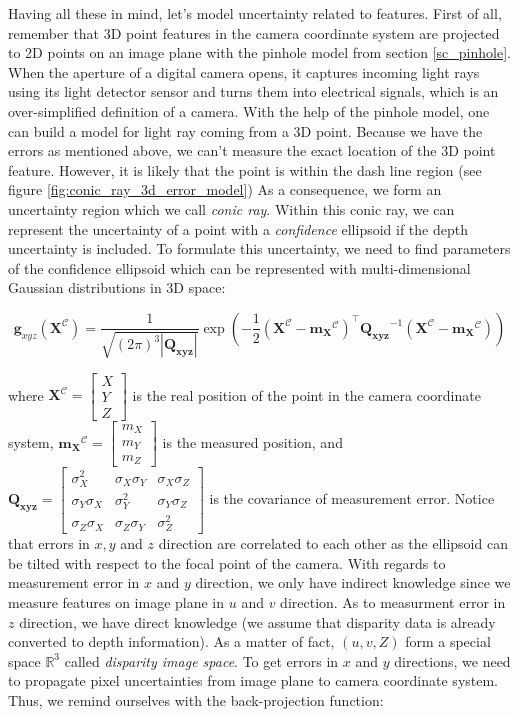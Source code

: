 \documentclass[a4paper]{report}
\numberwithin{figure}{section}
\newcommand{\R}{\mathbb{R}}
\begin{document}
Having all these in mind, let's model uncertainty related to features.  First
of all, remember that 3D point features in the camera coordinate system are
projected to 2D points on an image plane with the pinhole model from section
\ref{sc_pinhole}.  When the aperture of a digital camera opens, it captures
incoming light rays using its light detector sensor and turns them into 
electrical signals, which is an over-simplified
definition of a camera. With the help of the pinhole model, one can build a
model for light ray coming from a 3D point.  Because we have the errors as
mentioned above, we can't measure the exact location of the 3D point feature.
However, it is likely that the point is within the dash line region (see figure
\ref{fig:conic_ray_3d_error_model}) As a consequence, we form an uncertainty
region which we call \textit{conic ray}.  Within this conic ray, we can
represent the uncertainty of a point with a \textit{confidence} ellipsoid if
the depth uncertainty is included.  To formulate this uncertainty, we need to
find parameters of the confidence ellipsoid which can be represented with
multi-dimensional Gaussian distributions in 3D space:

\begin{equation} \mathbf{g}_{xyz}(\mathbf{X}^{\mathcal{C}}) =
\frac{1}{\sqrt{(2\pi)^3|\mathbf{Q_{xyz}}|}} \exp(-\frac{1}{2}
(\mathbf{X}^{\mathcal{C}}-\mathbf{m_X}^{\mathcal{C}})^\top
\mathbf{Q_{xyz}}^{-1} (\mathbf{X}^{\mathcal{C}}-\mathbf{m_X}^{\mathcal{C}}))
\end{equation} \label{eq:cov_ellipse}

where $\mathbf{X}^{\mathcal{C}} = \begin{bmatrix} X \\ Y \\ Z\end{bmatrix}$ is
the real position of the point in the camera coordinate system,
$\mathbf{m_X}^{\mathcal{C}} = \begin{bmatrix} m_X \\ m_Y \\ m_Z \end{bmatrix}$
is the measured position, and $\mathbf{Q_{xyz}} = \begin{bmatrix} \sigma_X^2 &
\sigma_X\sigma_Y & \sigma_X\sigma_Z \\ \sigma_Y\sigma_X & \sigma_Y^2 &
\sigma_Y\sigma_Z\\ \sigma_Z\sigma_X & \sigma_Z\sigma_Y &
\sigma_Z^2\end{bmatrix}$ is the covariance of measurement error.  Notice that
errors in $x,y$ and $z$ direction are correlated to each other as the ellipsoid
can be tilted with respect to the focal point of the camera.  With regards to
measurement error in $x$ and $y$ direction, we only have indirect knowledge
since we measure features on image plane in $u$ and $v$ direction.  As to
measurment error in $z$ direction, we have direct knowledge (we assume that
disparity data is already converted to depth information).  As a matter of
fact, $(u,v,Z)$ form a special space $\R^3$ called \textit{disparity image
space}.  To get errors in $x$ and $y$ directions, we need to propagate pixel
uncertainties from image plane to camera coordinate system. Thus, we remind
ourselves with the back-projection function:
\end{document}
